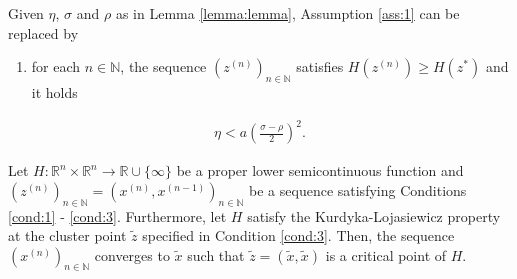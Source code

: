 \documentclass[11pt]{article}
\begin{document}
\begin{corollarymd}
	Given $\eta$, $\sigma$ and $\rho$ as in Lemma \ref{lemma:lemma}, Assumption \ref{ass:1} can be replaced by
	\begin{enumerate}[label=(A\arabic*')]
		\item for each $n \in \mathbb{N}$, the sequence $(z^{(n)})_{n \in \mathbb{N}}$ satisfies $H(z^{(n)}) \geq H(z^\ast)$\label{ass:1p} and it holds
	\end{enumerate}
	\begin{align}
		\eta < a\left(\frac{\sigma - \rho}{2}\right)^2\label{eq:corollary}.
	\end{align}\label{corollary:corollary}
\end{corollarymd}

\begin{theoremmd}
	Let $H: \mathbb{R}^n \times \mathbb{R}^n \rightarrow \mathbb{R} \cup \{\infty\}$ be a proper lower semicontinuous function and $(z^{(n)})_{n \in \mathbb{N}} = (x^{(n)}, x^{(n - 1)})_{n \in \mathbb{N}}$ be a sequence satisfying Conditions \ref{cond:1} - \ref{cond:3}. Furthermore, let $H$ satisfy the Kurdyka-Lojasiewicz property at the cluster point $\tilde{z}$ specified in Condition \ref{cond:3}. Then, the sequence $(x^{(n)})_{n \in \mathbb{N}}$  converges to $\tilde{x}$ such that $\tilde{z} = (\tilde{x}, \tilde{x})$ is a critical point of $H$.
\end{theoremmd}
\end{document}
